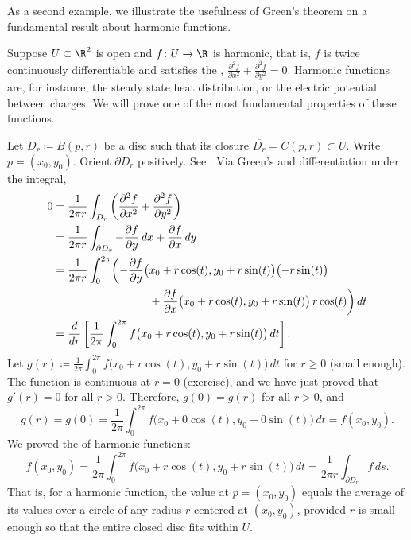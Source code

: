 As a second example, we illustrate the usefulness of Green's theorem on a fundamental result
about harmonic functions.

\begin{example}
Suppose $U \subset \R^2$ is open and
$f \colon U \to \R$ is harmonic, that is, $f$ is twice continuously
differentiable and
satisfies the \emph{},
$\frac{\partial^2 f}{\partial x^2} +
\frac{\partial^2 f}{\partial y^2} = 0$.
Harmonic functions are, for instance, the steady state heat distribution,
or the electric potential between charges.
We will prove one of the most fundamental properties of these functions.

Let $D_r \coloneqq B(p,r)$ be a disc such that its closure $\overline{D_r} = C(p,r) \subset U$.  Write
$p = (x_0,y_0)$.  Orient
$\partial D_r$ positively.  See .
Via Green's and differentiation under the integral,
\begin{equation*}
\begin{split}
0
& =
\frac{1}{2\pi r}
\int_{D_r}
\left(
\frac{\partial^2 f}{\partial x^2} +
\frac{\partial^2 f}{\partial y^2}
\right)
\\
& 
=
\frac{1}{2\pi r}
\int_{\partial D_r}
- \frac{\partial f}{\partial y} \, dx + 
\frac{\partial f}{\partial x} \, dy
\\
&
=
\frac{1}{2\pi r}
\int_0^{2\pi}
\biggl(
- \frac{\partial f}{\partial y} \bigl(x_0+r\cos(t),y_0+r\sin(t)\bigr) \bigl(-r\sin(t)\bigr)
\\
& \hspace{1.2in}
+ \frac{\partial f}{\partial x} \bigl(x_0+r\cos(t),y_0+r\sin(t)\bigr) \, r\cos(t)
\biggr) \, dt
\\
&
=
\frac{d}{dr}
\left[
\frac{1}{2\pi}
\int_0^{2\pi}
f\bigl(x_0+r\cos(t),y_0+r\sin(t)\bigr) \, dt
\right] .
\end{split}
\end{equation*}
Let $g(r) \coloneqq 
\frac{1}{2\pi}
\int_0^{2\pi}
f\bigl(x_0+r\cos(t),y_0+r\sin(t)\bigr) \, dt$ for $r \geq 0$ (small enough).
The function is continuous at $r=0$ (exercise), and we have just proved that
$g'(r) = 0$ for all $r > 0$.
Therefore, $g(0) = g(r)$ for all $r > 0$, and
\begin{equation*}
g(r) = g(0) = 
\frac{1}{2\pi}
\int_0^{2\pi}
f\bigl(x_0+0\cos(t),y_0+0\sin(t)\bigr) \, dt
=
f(x_0,y_0).
\end{equation*}
We
proved the \emph{} of harmonic functions:
\begin{equation*}
f(x_0,y_0) = 
\frac{1}{2\pi}
\int_0^{2\pi}
f\bigl(x_0+r\cos(t),y_0+r\sin(t)\bigr) \, dt 
=
\frac{1}{2\pi r}
\int_{\partial D_r} f \, ds .
\end{equation*}
That is, for a harmonic function, the value at $p = (x_0,y_0)$ equals the average
of its values
over a circle of any radius $r$ centered at $(x_0,y_0)$,
provided $r$ is small enough so that the entire closed disc fits within $U$.
\end{example}

